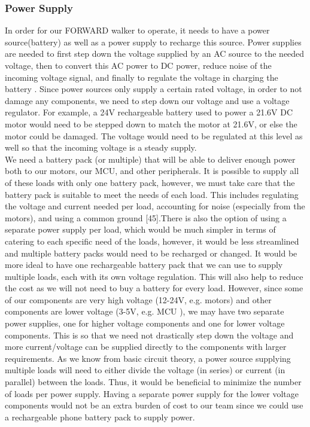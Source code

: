 \subsubsection{Power Supply}
\noindent In order for our FORWARD walker to operate, it needs to have a power source(battery) as well as a power supply to recharge this source. Power supplies are needed to first step down the voltage supplied by an AC source to the needed voltage, then to convert this AC power to DC power, reduce noise of the incoming voltage signal, and finally to regulate the voltage in charging the battery \cite{ActPower}. Since power sources only supply a certain rated voltage, in order to not damage any components, we need to step down our voltage and use a voltage regulator. For example, a 24V rechargeable battery used to power a 21.6V DC motor would need to be stepped down to match the motor at 21.6V, or else the motor could be damaged. The voltage would need to be regulated at this level as well so that the incoming voltage is a steady supply. \\

\noindent We need a battery pack (or multiple) that will be able to deliver enough power both to our motors, our MCU, and other peripherals. It is possible to supply all of these loads with only one battery pack, however, we must take care that the battery pack is suitable to meet the needs of each load. This includes regulating the voltage and current needed per load, accounting for noise (especially from the motors), and using a common ground [45].There is also the option of using a separate power supply per load, which would be much simpler in terms of catering to each specific need of the loads, however, it would be less streamlined and multiple battery packs would need to be recharged or changed. It would be more ideal to have one rechargeable battery pack that we can use to supply multiple loads, each with its own voltage regulation. This will also help to reduce the cost as we will not need to buy a battery for every load. However, since some of our components are very high voltage (12-24V, e.g. motors) and other components are lower voltage (3-5V, e.g. MCU \cite{Espressif1}), we may have two separate power supplies, one for higher voltage components and one for lower voltage components. This is so that we need not drastically step down the voltage and more current/voltage can be supplied directly to the components with larger requirements. As we know from basic circuit theory, a power source supplying multiple loads will need to either divide the voltage (in series) or current (in parallel) between the loads. Thus, it would be beneficial to minimize the number of loads per power supply. Having a separate power supply for the lower voltage components would not be an extra burden of cost to our team since we could use a rechargeable phone battery pack to supply power. \\ 

